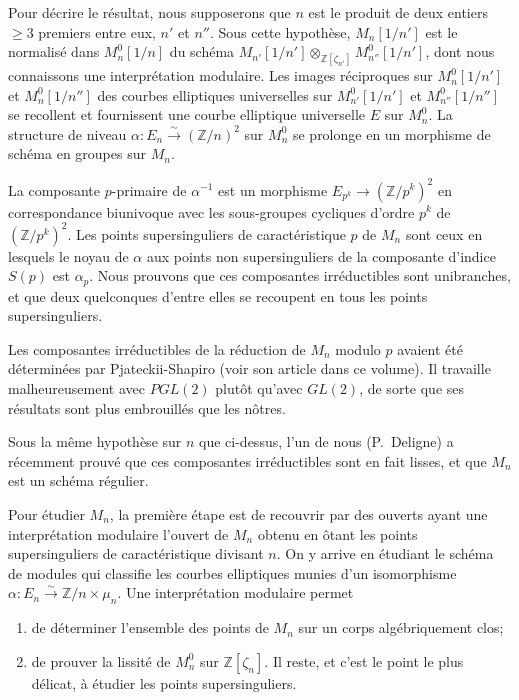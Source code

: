 \documentclass{amsart}
\theoremstyle{plain}
\theoremstyle{remark}
\newcommand{\bbZ}{\mathbb{Z}}
\begin{document}
Pour d\'ecrire le r\'esultat, nous supposerons que $n$ est le produit de deux entiers $\geq 3$ premiers entre eux, $n'$ et $n''$. Sous cette hypoth\`ese, $M_n[1/n']$ est le normalis\'e dans $M_n^0[1/n]$ du sch\'ema $M_{n'}[1/n'] \otimes_{\bbZ[\zeta_{n'}]} M_{n''}^0[1/n']$, dont nous connaissons une interpr\'etation modulaire. Les images r\'eciproques sur $M_n^0[1/n']$ et $M_n^0[1/n'']$ des courbes elliptiques universelles sur $M_{n'}^0[1/n']$ et $M_{n''}^0[1/n'']$ se recollent et fournissent une courbe elliptique universelle $E$ sur $M_n^0$. La structure de niveau $\alpha: E_n \xrightarrow{\sim} (\bbZ/n)^2$ sur $M_n^0$ se prolonge en un morphisme de sch\'ema en groupes sur $M_n$.

La composante $p$-primaire de $\alpha^{-1}$ est un morphisme $E_{p^k} \to (\bbZ/p^k)^2$ en correspondance biunivoque avec les sous-groupes cycliques d'ordre $p^k$ de $(\bbZ/p^k)^2$. Les points supersinguliers de caract\'eristique $p$ de $M_n$ sont ceux en lesquels le noyau de $\alpha$ aux points non supersinguliers de la composante d'indice $S(p)$ est $\alpha_p$. Nous prouvons que ces composantes irr\'eductibles sont unibranches, et que deux quelconques d'entre elles se recoupent en tous les points supersinguliers.

Les composantes irr\'eductibles de la r\'eduction de $M_n$ modulo $p$ avaient \'et\'e d\'etermin\'ees par Pjateckii-Shapiro (voir son article dans ce volume). Il travaille malheureusement avec $PGL(2)$ plut\^ot qu'avec $GL(2)$, de sorte que ses r\'esultats sont plus embrouill\'es que les n\^otres.

Sous la m\^eme hypoth\`ese sur $n$ que ci-dessus, l'un de nous (P.~Deligne) a r\'ecemment prouv\'e que ces composantes irr\'eductibles sont en fait lisses, et que $M_n$ est un sch\'ema r\'egulier.

Pour \'etudier $M_n$, la premi\`ere \'etape est de recouvrir par des ouverts ayant une interpr\'etation modulaire l'ouvert de $M_n$ obtenu en \^otant les points supersinguliers de caract\'eristique divisant $n$. On y arrive en \'etudiant le sch\'ema de modules qui classifie les courbes elliptiques munies d'un isomorphisme $\alpha: E_n \xrightarrow{\sim} \bbZ/n \times \mu_n$. Une interpr\'etation modulaire permet
\begin{enumerate}
\item[a)] de d\'eterminer l'ensemble des points de $M_n$ sur un corps alg\'ebriquement clos;
\item[b)] de prouver la lissit\'e de $M_n^0$ sur $\bbZ[\zeta_n]$. Il reste, et c'est le point le plus d\'elicat, \`a \'etudier les points supersinguliers.
\end{enumerate}
\end{document}
